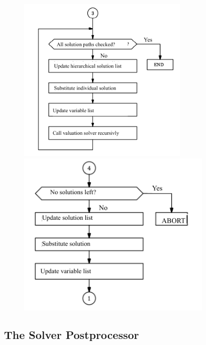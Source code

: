 \begin {figure} [htbp]
\begin {center}
\includegraphics[height=8cm]{Valsolv2aEn.png}
\includegraphics[height=8cm]{Valsolv2bEn.png}
\caption {}
\end {center}
\end {figure}


\clearpage


\subsection{The Solver Postprocessor}

